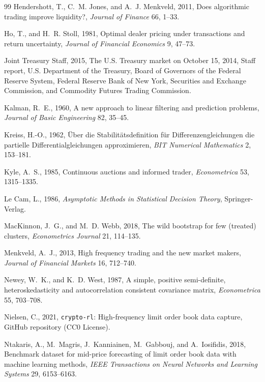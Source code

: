 \documentclass[12pt]{article}
\theoremstyle{definition}
\theoremstyle{remark}
\begin{document}
\begin{thebibliography}{99}
Hendershott, T., C.~M. Jones, and A.~J. Menkveld, 2011, Does algorithmic trading improve liquidity?, \emph{Journal of Finance} 66, 1--33.

Ho, T., and H.~R. Stoll, 1981, Optimal dealer pricing under transactions and return uncertainty, \emph{Journal of Financial Economics} 9, 47--73.

Joint Treasury Staff, 2015, The U.S. Treasury market on October 15, 2014, Staff report, U.S. Department of the Treasury, Board of Governors of the Federal Reserve System, Federal Reserve Bank of New York, Securities and Exchange Commission, and Commodity Futures Trading Commission.

Kalman, R.~E., 1960, A new approach to linear filtering and prediction problems, \emph{Journal of Basic Engineering} 82, 35--45.

Kreiss, H.-O., 1962, {\"U}ber die Stabilit{\"a}tsdefinition f{\"u}r Differenzengleichungen die partielle Differentialgleichungen approximieren, \emph{BIT Numerical Mathematics} 2, 153--181.

Kyle, A.~S., 1985, Continuous auctions and informed trader, \emph{Econometrica} 53, 1315--1335.

Le Cam, L., 1986, \emph{Asymptotic Methods in Statistical Decision Theory}, Springer-Verlag.

MacKinnon, J.~G., and M.~D. Webb, 2018, The wild bootstrap for few (treated) clusters, \emph{Econometrics Journal} 21, 114--135.

Menkveld, A.~J., 2013, High frequency trading and the new market makers, \emph{Journal of Financial Markets} 16, 712--740.

Newey, W.~K., and K.~D. West, 1987, A simple, positive semi-definite, heteroskedasticity and autocorrelation consistent covariance matrix, \emph{Econometrica} 55, 703--708.

Nielsen, C., 2021, \texttt{crypto-rl}: High-frequency limit order book data capture, GitHub repository (CC0 License).

Ntakaris, A., M.~Magris, J.~Kanniainen, M.~Gabbouj, and A.~Iosifidis, 2018, Benchmark dataset for mid-price forecasting of limit order book data with machine learning methods, \emph{IEEE Transactions on Neural Networks and Learning Systems} 29, 6153--6163.


\end{thebibliography}
\end{document}
